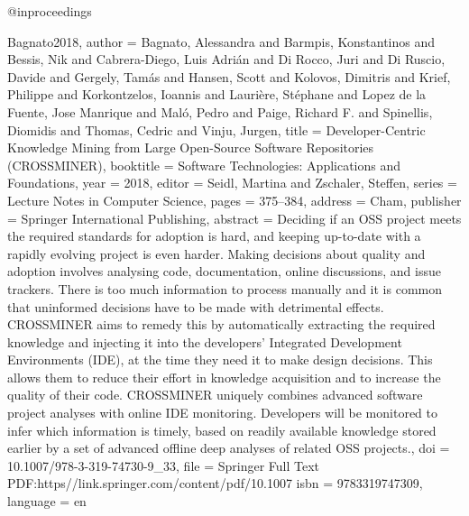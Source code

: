 {{{@inproceedings{Bagnato2018,
  author    = {Bagnato, Alessandra and Barmpis, Konstantinos and Bessis, Nik and Cabrera-Diego, Luis Adrián and Di Rocco, Juri and Di Ruscio, Davide and Gergely, Tamás and Hansen, Scott and Kolovos, Dimitris and Krief, Philippe and Korkontzelos, Ioannis and Laurière, Stéphane and Lopez de la Fuente, Jose Manrique and Maló, Pedro and Paige, Richard F. and Spinellis, Diomidis and Thomas, Cedric and Vinju, Jurgen},
  title     = {Developer-{Centric} {Knowledge} {Mining} from {Large} {Open}-{Source} {Software} {Repositories} ({CROSSMINER})},
  booktitle = {Software {Technologies}: {Applications} and {Foundations}},
  year      = {2018},
  editor    = {Seidl, Martina and Zschaler, Steffen},
  series    = {Lecture {Notes} in {Computer} {Science}},
  pages     = {375--384},
  address   = {Cham},
  publisher = {Springer International Publishing},
  abstract  = {Deciding if an OSS project meets the required standards for adoption is hard, and keeping up-to-date with a rapidly evolving project is even harder. Making decisions about quality and adoption involves analysing code, documentation, online discussions, and issue trackers. There is too much information to process manually and it is common that uninformed decisions have to be made with detrimental effects. CROSSMINER aims to remedy this by automatically extracting the required knowledge and injecting it into the developers’ Integrated Development Environments (IDE), at the time they need it to make design decisions. This allows them to reduce their effort in knowledge acquisition and to increase the quality of their code. CROSSMINER uniquely combines advanced software project analyses with online IDE monitoring. Developers will be monitored to infer which information is timely, based on readily available knowledge stored earlier by a set of advanced offline deep analyses of related OSS projects.},
  doi       = {10.1007/978-3-319-74730-9_33},
  file      = {Springer Full Text PDF:https\://link.springer.com/content/pdf/10.1007%
  isbn      = {9783319747309},
  language  = {en}
}

}}}}
